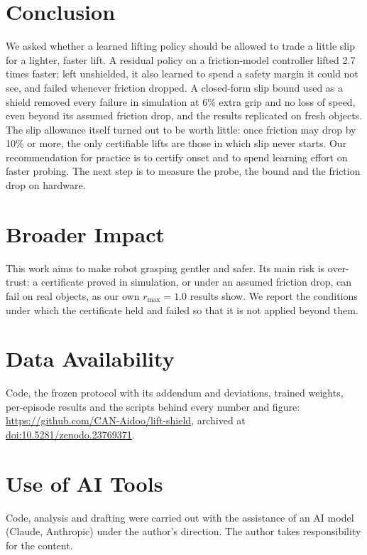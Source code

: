 \section{Conclusion}
We asked whether a learned lifting policy should be allowed to trade a little slip for a lighter, faster lift. A residual
policy on a friction-model controller lifted 2.7 times faster; left unshielded, it also learned to spend a safety margin it
could not see, and failed whenever friction dropped. A closed-form slip bound used as a shield removed every failure in
simulation at 6\% extra grip and no loss of speed, even beyond its assumed friction drop, and the results replicated on
fresh objects. The slip allowance itself turned out to be worth little: once friction may drop by 10\% or more, the only
certifiable lifts are those in which slip never starts. Our recommendation for practice is to certify onset and to spend
learning effort on faster probing. The next step is to measure the probe, the bound and the friction drop on hardware.

\section*{Broader Impact}
This work aims to make robot grasping gentler and safer. Its main risk is over-trust: a certificate proved in simulation, or
under an assumed friction drop, can fail on real objects, as our own $r_{\max}=1.0$ results show. We report the conditions
under which the certificate held and failed so that it is not applied beyond them.

\section*{Data Availability}
Code, the frozen protocol with its addendum and deviations, trained weights, per-episode results and the scripts behind every
number and figure: \url{https://github.com/CAN-Aidoo/lift-shield}, archived at
\href{https://doi.org/10.5281/zenodo.23769371}{doi:10.5281/zenodo.23769371}.

\section*{Use of AI Tools}
Code, analysis and drafting were carried out with the assistance of an AI model (Claude, Anthropic) under the author's
direction. The author takes responsibility for the content.
